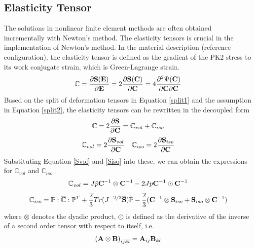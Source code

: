 \subsection{Elasticity Tensor} \label{general_elasticity}
The solutions in nonlinear finite element methods are often obtained incrementally with Newton's method. The elasticity tensors is crucial in the implementation of Newton's method.
In the material description (reference configuration), the elasticity tensor is defined as the gradient of the PK2 stress to its work conjugate strain, which is Green-Lagrange strain.
\begin{equation}
\mathbb{C} = \frac{\partial{\bold{S}(\bold{E})}}{\partial{\bold{E}}} =  2\frac{\partial{\bold{S}(\bold{C})}} {\partial{\bold{C}}} = 4 \frac{\partial^2{\Psi(\bold{C})}}{{\partial{\bold{C}}}{\partial{\bold{C}}}}
\end{equation}
Based on the split of deformation tensors in Equation \ref{split1} and the assumption in Equation \ref{split2}, the elasticity tensors can be rewritten in the decoupled form
\begin{equation} \label{C}
\mathbb{C} = 2\frac{\partial{\bold{S}}}{\partial{\bold{C}}} = \mathbb{C}_{vol} + \mathbb{C}_{iso} 
\end{equation}
\begin{equation} \label{Cvol}
\mathbb{C}_{vol} = 2\frac{\partial{\bold{S}_{vol}}}{\partial{\bold{C}}}
\quad
\mathbb{C}_{iso} = 2\frac{\partial{\bold{S}_{iso}}}{\partial{\bold{C}}}
\end{equation}
Substituting Equation \ref{Svol} and \ref{Siso}  into these, we can obtain the expressions for $\mathbb{C}_{vol}$ and $\mathbb{C}_{iso}$ .
\begin{equation} \label{Cvol}
\mathbb{C}_{vol} = J\tilde{p}\bold{C}^{-1}\otimes\bold{C}^{-1} - 2Jp\bold{C}^{-1}\odot\bold{C}^{-1}
\end{equation}
\begin{equation} \label{Ciso}
\mathbb{C}_{iso} = \mathbb{P} : \overline{\mathbb{C}} : \mathbb{P}^T + \frac{2}{3}Tr(J^{-2/3}\overline{\bold{S}})\tilde{\mathbb{P}} - \frac{2}{3}(\bold{C}^{-1}\otimes\bold{S}_{iso} + \bold{S}_{iso}\otimes \bold{C}^{-1})
\end{equation}
where $\otimes$ denotes the dyadic product, $\odot$ is defined as the derivative of the inverse of a second order tensor with respect to itself, i.e.
\begin{equation}\label{dyadic}
{(\bold{A} \otimes \bold{B})}_{ijkl} = {\bold{A}}_{ij}{\bold{B}}_{kl}
\end{equation}
